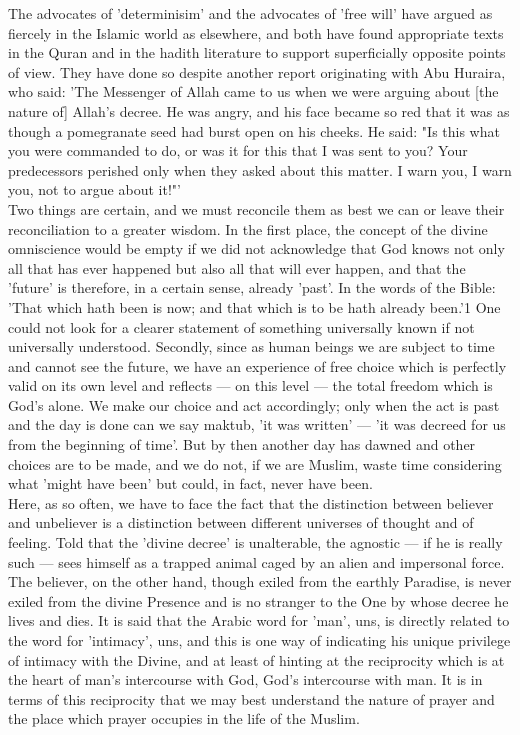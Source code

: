 \documentclass[11pt, b5paper, twoside]{book}
\begin{document}
The advocates of 'determinisim' and the advocates of 'free will' have argued as fiercely in the 
Islamic world as elsewhere, and both have found appropriate texts in the Quran and in the hadith 
literature to support superficially opposite points of view. They have done so despite another report 
originating with Abu Huraira, who said: 'The Messenger of Allah came to us when we were arguing about 
[the nature of] Allah's decree. He was angry, and his face became so red that it was as though a 
pomegranate seed had burst open on his cheeks. He said: "Is this what you were commanded to do, or 
was it for this that I was sent to you? Your predecessors perished only when they asked about this 
matter. I warn you, I warn you, not to argue about it!"' \\

Two things are certain, and we must reconcile them as best we can or leave their reconciliation to a 
greater wisdom. In the first place, the concept of the divine omniscience would be empty if we did 
not acknowledge that God knows not only all that has ever happened but also all that will ever 
happen, and that the 'future' is therefore, in a certain sense, already 'past'. In the words of the 
Bible: 'That which hath been is now; and that which is to be hath already been.'1 One could not look 
for a clearer statement of something universally known if not universally understood. Secondly, since 
as human beings we are subject to time and cannot see the future, we have an experience of free 
choice which is perfectly valid on its own level and reflects --- on this level --- the total freedom 
which is God's alone. We make our choice and act accordingly; only when the act is past and the day 
is done can we say maktub, 'it was written' --- 'it was decreed for us from the beginning of time'. But 
by then another day has dawned and other choices are to be made, and we do not, if we are Muslim, 
waste time considering what 'might have been' but could, in fact, never have been. \\

Here, as so often, we have to face the fact that the distinction between believer and unbeliever is a 
distinction between different universes of thought and of feeling. Told that the 'divine decree' is 
unalterable, the agnostic --- if he is really such --- sees himself as a trapped animal caged by an alien 
and impersonal force. The believer, on the other hand, though exiled from the earthly Paradise, is 
never exiled from the divine Presence and is no stranger to the One by whose decree he lives and 
dies. It is said that the Arabic word for 'man', uns, is directly related to the word for 'intimacy', 
uns, and this is one way of indicating his unique privilege of intimacy with the Divine, and at least 
of hinting at the reciprocity which is at the heart of man's intercourse with God, God's intercourse 
with man. It is in terms of this reciprocity that we may best understand the nature of prayer and the 
place which prayer occupies in the life of the Muslim. \\
\end{document}
